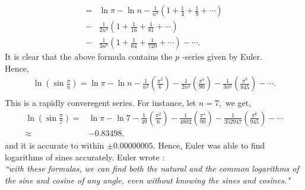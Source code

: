 \documentclass[a4paper,reqno,11pt]{amsart}
\theoremstyle{plain}%
\begin{document}
\begin{Proof}
\begin{align*}
=& \ln \pi - \ln n - \frac{1}{n^2}\left(1 + \frac{1}{4} + \frac{1}{9} + \cdots\right)\\ -& \frac{1}{2n^4}\left(1 + \frac{1}{16} + \frac{1}{81} + \cdots\right)\\ -& \frac{1}{3n^6}\left(1 + \frac{1}{64} + \frac{1}{729} + \cdots\right) - \cdots.
\end{align*}
It is clear that the above formula contains the $p$ -series given by Euler.\\
Hence,\\
\begin{eqnarray*} \ln(\sin \frac{\pi}{n}) = \ln \pi - \ln n -\frac{1}{n^2}\left(\frac{\pi^2}{6}\right) -\frac{1}{2n^4}\left(\frac{\pi^4}{90}\right) -\frac{1}{3n^6}\left(\frac{\pi^6}{945}\right) -\cdots.\\ \end{eqnarray*}
This is a rapidly converegent series. For instance, let $n = 7,$ we get,\\
\begin{align*}
\ln(\sin \frac{\pi}{7}) =& \ln \pi - \ln 7 -\frac{1}{49}\left(\frac{\pi^2}{6}\right) -\frac{1}{4802}\left(\frac{\pi^4}{90}\right) -\frac{1}{352947}\left(\frac{\pi^6}{945}\right) -\cdots\\
\approx& -0.83498,
\end{align*}
and it is accurate to within $\pm0.00000005.$ Hence, Euler was able to find logarithms of sines accurately.
 Euler wrote :\\
\indent \textit{``with these formulas, we can find both the natural and the common 
logarithms of the sine and cosine of any angle, even without knowing 
the sines and cosines."} \\


\end{Proof}
\end{document}
